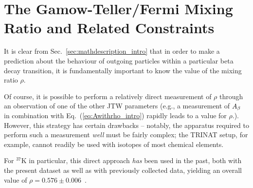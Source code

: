 %














{
	\pagebreak
}
{}
\section{The Gamow-Teller/Fermi Mixing Ratio and Related Constraints}
\label{sec:extractinglambda}
It is clear from Sec.~\ref{sec:mathdescription_intro} that in order to make a prediction about the behaviour of outgoing particles within a particular beta decay transition, it is fundamentally important to know the value of the mixing ratio $\rho$.

Of course, it is possible to perform a relatively direct measurement of $\rho$ through an observation of one of the other \ac{JTW} parameters (e.g., a measurement of $A_{\beta}$ in combination with Eq.~(\ref{eq:Awithrho_intro}) rapidly leads to a value for $\rho$.).  However, this strategy has certain drawbacks -- notably, the apparatus required to perform such a measurement \emph{well} must be fairly complex;  the TRINAT setup, for example, cannot readily be used with isotopes of most chemical elements.  

For $^{37}$K in particular, this direct approach \emph{has} been used in the past, both with the present dataset as well as with previously collected data, yielding an overall value of $\rho=0.576 \pm 0.006$~\cite{ben_Abeta,shidling2014,dan_Bnu}.

